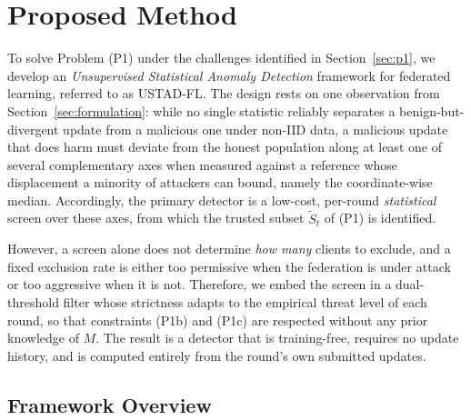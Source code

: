 \documentclass[journal]{IEEEtran}
\begin{document}
\section{Proposed Method}
\label{sec:method}

To solve Problem (P1) under the challenges identified in Section~\ref{sec:p1}, we develop an \emph{Unsupervised Statistical Anomaly Detection} framework for federated learning, referred to as USTAD-FL. The design rests on one observation from Section~\ref{sec:formulation}: while no single statistic reliably separates a benign-but-divergent update from a malicious one under non-IID data, a malicious update that does harm must deviate from the honest population along at least one of several complementary axes when measured against a reference whose displacement a minority of attackers can bound, namely the coordinate-wise median. Accordingly, the primary detector is a low-cost, per-round \emph{statistical} screen over these axes, from which the trusted subset $\widetilde{S}_t$ of (P1) is identified.

However, a screen alone does not determine \emph{how many} clients to exclude, and a fixed exclusion rate is either too permissive when the federation is under attack or too aggressive when it is not. Therefore, we embed the screen in a dual-threshold filter whose strictness adapts to the empirical threat level of each round, so that constraints (P1b) and (P1c) are respected without any prior knowledge of $M$. The result is a detector that is training-free, requires no update history, and is computed entirely from the round's own submitted updates.

\subsection{Framework Overview}
\end{document}
